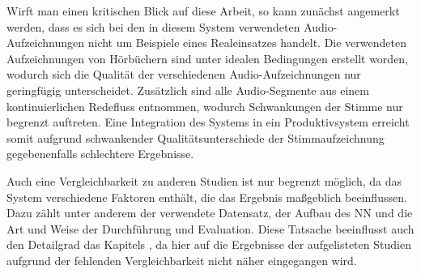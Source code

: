 Wirft man einen kritischen Blick auf diese Arbeit, so kann zunächst angemerkt werden, dass es sich bei den in diesem System verwendeten Audio-Aufzeichnungen nicht um Beispiele eines Realeinsatzes handelt.
Die verwendeten Aufzeichnungen von Hörbüchern sind unter idealen Bedingungen erstellt worden, wodurch sich die Qualität der verschiedenen Audio-Aufzeichnungen nur geringfügig unterscheidet.
Zusätzlich sind alle Audio-Segmente aus einem kontinuierlichen Redefluss entnommen, wodurch Schwankungen der Stimme nur begrenzt auftreten.
Eine Integration des Systems in ein Produktivsystem erreicht somit aufgrund schwankender Qualitätsunterschiede der Stimmaufzeichnung gegebenenfalls schlechtere Ergebnisse.

Auch eine Vergleichbarkeit zu anderen Studien ist nur begrenzt möglich, da das System verschiedene Faktoren enthält, die das Ergebnis maßgeblich beeinflussen.
Dazu zählt unter anderem der verwendete Datensatz, der Aufbau des \ac{NN} und die Art und Weise der Durchführung und Evaluation.
Diese Tatsache beeinflusst auch den Detailgrad das Kapitels , da hier auf die Ergebnisse der aufgelisteten Studien aufgrund der fehlenden Vergleichbarkeit nicht näher eingegangen wird.




\textauthor{\vHS}{}{}

